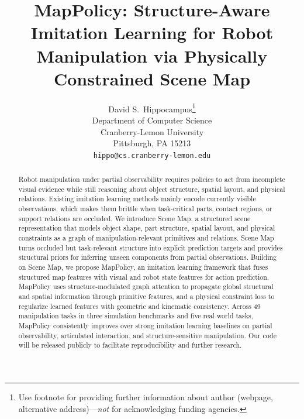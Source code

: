 \documentclass{article}
\title{MapPolicy: Structure-Aware Imitation Learning for Robot Manipulation via Physically Constrained Scene Map}
\author{%
  David S.~Hippocampus\thanks{Use footnote for providing further information
    about author (webpage, alternative address)---\emph{not} for acknowledging
    funding agencies.} \\
  Department of Computer Science\\
  Cranberry-Lemon University\\
  Pittsburgh, PA 15213 \\
  \texttt{hippo@cs.cranberry-lemon.edu} \\
}
\begin{document}
\maketitle


\begin{abstract}
Robot manipulation under partial observability requires policies to act from incomplete visual evidence while still reasoning about object structure, spatial layout, and physical relations.
Existing imitation learning methods mainly encode currently visible observations, which makes them brittle when task-critical parts, contact regions, or support relations are occluded.
We introduce Scene Map, a structured scene representation that models object shape, part structure, spatial layout, and physical constraints as a graph of manipulation-relevant primitives and relations.
Scene Map turns occluded but task-relevant structure into explicit prediction targets and provides structural priors for inferring unseen components from partial observations.
Building on Scene Map, we propose MapPolicy, an imitation learning framework that fuses structured map features with visual and robot state features for action prediction.
MapPolicy uses structure-modulated graph attention to propagate global structural and spatial information through primitive features, and a physical constraint loss to regularize learned features with geometric and kinematic consistency.
Across 49 manipulation tasks in three simulation benchmarks and five real world tasks, MapPolicy consistently improves over strong imitation learning baselines on partial observability, articulated interaction, and structure-sensitive manipulation.
Our code will be released publicly to facilitate reproducibility and further research.
\end{abstract}











\newpage

 




\end{document}
